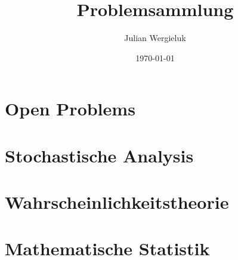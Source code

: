 \documentclass[12pt,oldfontcommands,oneside,a4paper,article]{memoir}
\title{Problemsammlung}\author{Julian Wergieluk}\date{\today}
\begin{document}
\pagestyle{headings}

\maketitle
\tableofcontents


\setcounter{secnumdepth}{4}
\renewcommand{\theparagraph}{\arabic{chapter}.\arabic{paragraph}}
\renewcommand{\theenumi}{\Alph{enumi}.}
\renewcommand{\labelenumi}{\theenumi}


\chapter{Open Problems}



\chapter{Stochastische Analysis}



\chapter{Wahrscheinlichkeitstheorie}



\chapter{Mathematische Statistik}












\backmatter

\printbibliography
%
%
\end{document}
